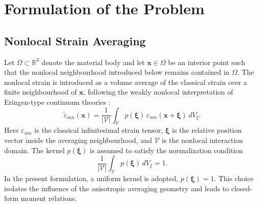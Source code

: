 \documentclass[final,3p,times,fleqn]{elsarticle}
\begin{document}
\section{Formulation of the Problem}

\subsection{Nonlocal Strain Averaging}

Let $\Omega\subset\mathbb{R}^{3}$ denote the material body and let
$\mathbf{x}\in\Omega$ be an interior point such that the nonlocal
neighbourhood introduced below remains contained in $\Omega$. The
nonlocal strain is introduced as a volume average of the classical strain
over a finite neighbourhood of $\mathbf{x}$, following the weakly
nonlocal interpretation of Eringen-type continuum theories
\cite{EringenEdelen1972,Eringen1972Polar,Eringen1983}:
\begin{equation}\label{eq:nonlocal_strain}
  \tilde{\varepsilon}_{mn}(\mathbf{x})
  =
  \frac{1}{|\mathcal{V}|}
  \int_{\mathcal{V}}
  p(\boldsymbol{\xi})\,
  \varepsilon_{mn}(\mathbf{x}+\boldsymbol{\xi})\,dV_{\xi}.
\end{equation}
Here $\varepsilon_{mn}$ is the classical infinitesimal strain tensor,
$\boldsymbol{\xi}$ is the relative position vector inside the averaging
neighbourhood, and $\mathcal{V}$ is the nonlocal interaction domain.
The kernel $p(\boldsymbol{\xi})$ is assumed to satisfy the normalization
condition
\begin{equation}\label{eq:kernel_normalization}
  \frac{1}{|\mathcal{V}|}
  \int_{\mathcal{V}}p(\boldsymbol{\xi})\,dV_{\xi}
  =
  1 .
\end{equation}
In the present formulation, a uniform kernel is adopted,
$p(\boldsymbol{\xi})=1$. This choice isolates the influence of the
anisotropic averaging geometry and leads to closed-form moment
relations.
\end{document}

